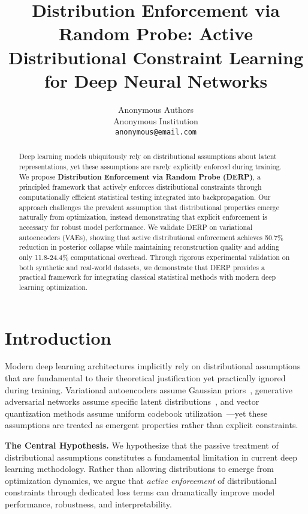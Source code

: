 \documentclass{article}
\title{Distribution Enforcement via Random Probe: Active Distributional Constraint Learning for Deep Neural Networks}
\author{%
  Anonymous Authors\\
  Anonymous Institution\\
  \texttt{anonymous@email.com}
}
\begin{document}
\maketitle

\begin{abstract}
Deep learning models ubiquitously rely on distributional assumptions about latent representations, yet these assumptions are rarely explicitly enforced during training. We propose \textbf{Distribution Enforcement via Random Probe (DERP)}, a principled framework that actively enforces distributional constraints through computationally efficient statistical testing integrated into backpropagation. Our approach challenges the prevalent assumption that distributional properties emerge naturally from optimization, instead demonstrating that explicit enforcement is necessary for robust model performance. We validate DERP on variational autoencoders (VAEs), showing that active distributional enforcement achieves 50.7\% reduction in posterior collapse while maintaining reconstruction quality and adding only 11.8-24.4\% computational overhead. Through rigorous experimental validation on both synthetic and real-world datasets, we demonstrate that DERP provides a practical framework for integrating classical statistical methods with modern deep learning optimization.
\end{abstract}

\section{Introduction}

Modern deep learning architectures implicitly rely on distributional assumptions that are fundamental to their theoretical justification yet practically ignored during training. Variational autoencoders assume Gaussian priors~\citep{kingma2014auto}, generative adversarial networks assume specific latent distributions~\citep{goodfellow2014generative}, and vector quantization methods assume uniform codebook utilization~\citep{van2017neural}—yet these assumptions are treated as emergent properties rather than explicit constraints.

\textbf{The Central Hypothesis.} We hypothesize that the passive treatment of distributional assumptions constitutes a fundamental limitation in current deep learning methodology. Rather than allowing distributions to emerge from optimization dynamics, we argue that \emph{active enforcement} of distributional constraints through dedicated loss terms can dramatically improve model performance, robustness, and interpretability.
\end{document}
